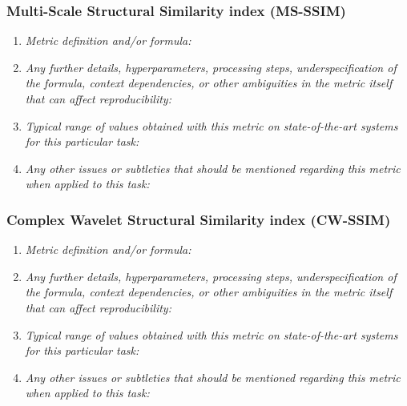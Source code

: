 \documentclass[a4paper,11pt]{article}
\begin{document}
        \subsubsection{Multi-Scale Structural Similarity index (MS-SSIM)}
            \begin{enumerate}[label=\alph*.]
                \item \textit{Metric definition and/or formula:}
                \bigskip
                \item \textit{Any further details, hyperparameters, processing steps, underspecification of the formula, context dependencies, or other ambiguities in the metric itself that can affect reproducibility:}
                \bigskip
                \item \textit{Typical range of values obtained with this metric on state-of-the-art systems for this particular task:}
                \bigskip
                \item \textit{Any other issues or subtleties that should be mentioned regarding this metric when applied to this task:}
                \bigskip
            \end{enumerate}
        \subsubsection{Complex Wavelet Structural Similarity index (CW-SSIM)}
            \begin{enumerate}[label=\alph*.]
                \item \textit{Metric definition and/or formula:}
                \bigskip
                \item \textit{Any further details, hyperparameters, processing steps, underspecification of the formula, context dependencies, or other ambiguities in the metric itself that can affect reproducibility:}
                \bigskip
                \item \textit{Typical range of values obtained with this metric on state-of-the-art systems for this particular task:}
                \bigskip
                \item \textit{Any other issues or subtleties that should be mentioned regarding this metric when applied to this task:}
                \bigskip
            \end{enumerate}
\end{document}

